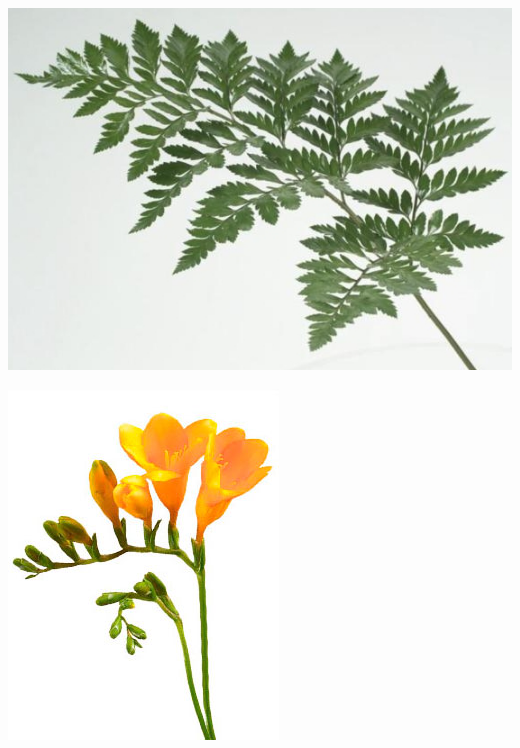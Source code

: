 \documentclass{article}
\begin{document}
\begin{center}
\includegraphics[height=0.9\textheight, angle=90]{../Fern_LeatherLeaf_Leaf.jpg}
\end{center}
\newpage

\begin{center}
\includegraphics[height=0.9\textheight, angle=90]{../Freesia.jpg}
\end{center}
\newpage
\end{document}
